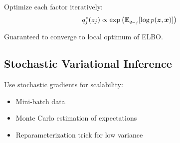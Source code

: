 Optimize each factor iteratively:
\begin{equation}
q_j^*(z_j) \propto \exp\left(\mathbb{E}_{q_{-j}}[\log p(\boldsymbol{z}, \boldsymbol{x})]\right)
\end{equation}

Guaranteed to converge to local optimum of ELBO.

\subsection{Stochastic Variational Inference}

Use stochastic gradients for scalability:
\begin{itemize}
    \item Mini-batch data
    \item Monte Carlo estimation of expectations
    \item Reparameterization trick for low variance
\end{itemize}





